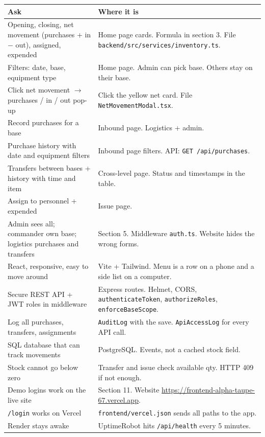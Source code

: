 \documentclass[11pt,a4paper]{article}
\newcommand{\livefront}{https://frontend-alpha-taupe-67.vercel.app}
\begin{document}
\begin{center}
\small
\begin{tabular}{>{\raggedright\arraybackslash}p{5.6cm}p{8.6cm}}
\toprule
\textbf{Ask} & \textbf{Where it is} \\
\midrule
Opening, closing, net movement (purchases + in $-$ out), assigned, expended & Home page cards. Formula in section 3. File \texttt{backend/src/services/inventory.ts}. \\
Filters: date, base, equipment type & Home page. Admin can pick base. Others stay on their base. \\
Click net movement $\rightarrow$ purchases / in / out pop-up & Click the yellow net card. File \texttt{NetMovementModal.tsx}. \\
Record purchases for a base & Inbound page. Logistics + admin. \\
Purchase history with date and equipment filters & Inbound page filters. API: \texttt{GET /api/purchases}. \\
Transfers between bases + history with time and item & Cross-level page. Status and timestamps in the table. \\
Assign to personnel + expended & Issue page. \\
Admin sees all; commander own base; logistics purchases and transfers & Section 5. Middleware \texttt{auth.ts}. Website hides the wrong forms. \\
React, responsive, easy to move around & Vite + Tailwind. Menu is a row on a phone and a side list on a computer. \\
Secure REST API + JWT roles in middleware & Express routes. Helmet, CORS, \texttt{authenticateToken}, \texttt{authorizeRoles}, \texttt{enforceBaseScope}. \\
Log all purchases, transfers, assignments & \texttt{AuditLog} with the save. \texttt{ApiAccessLog} for every API call. \\
SQL database that can track movements & PostgreSQL. Events, not a cached stock field. \\
Stock cannot go below zero & Transfer and issue check available qty. HTTP 409 if not enough. \\
Demo logins work on the live site & Section 11. Website \url{\livefront}. \\
\texttt{/login} works on Vercel & \texttt{frontend/vercel.json} sends all paths to the app. \\
Render stays awake & UptimeRobot hits \texttt{/api/health} every 5 minutes. \\
\bottomrule
\end{tabular}
\end{center}
\end{document}
